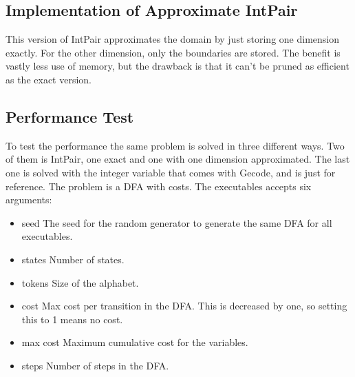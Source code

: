 \documentclass[a4paper,11pt]{article}
\begin{document}
\subsection{Implementation of Approximate IntPair}
This version of IntPair approximates the domain by just storing one dimension exactly. For the other dimension, only the boundaries are stored. The benefit is vastly less use of memory, but the drawback is that it can't be pruned as efficient as the exact version. 

\subsection{Performance Test}
To test the performance the same problem is solved in three different ways. Two of them is IntPair, one exact and one with one dimension approximated. The last one is solved with the integer variable that comes with Gecode, and is just for reference. The problem is a DFA with costs. The executables accepts six arguments: 
\begin{itemize}
\item{seed} The seed for the random generator to generate the same DFA for all executables.
\item{states} Number of states.
\item{tokens} Size of the alphabet.
\item{cost} Max cost per transition in the DFA. This is decreased by one, so setting this to 1 means no cost.
\item{max cost} Maximum cumulative cost for the variables.
\item{steps} Number of steps in the DFA.
\end{itemize}
\end{document}
